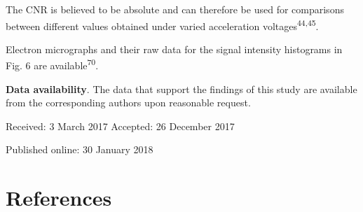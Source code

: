 \documentclass{article}
\begin{document}
The CNR is believed to be absolute and can therefore be used for comparisons between different values obtained under varied acceleration voltages\textsuperscript{44,45}.

Electron micrographs and their raw data for the signal intensity histograms in Fig. 6 are available\textsuperscript{70}.

\textbf{Data availability}. The data that support the findings of this study are available from the corresponding authors upon reasonable request.

Received: 3 March 2017 Accepted: 26 December 2017

Published online: 30 January 2018

\section*{References}
\end{document}
